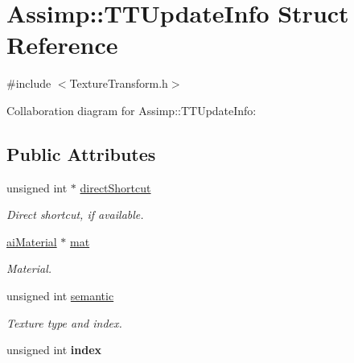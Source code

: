 \hypertarget{struct_assimp_1_1_t_t_update_info}{\section{Assimp\+:\+:T\+T\+Update\+Info Struct Reference}
\label{struct_assimp_1_1_t_t_update_info}
}


{\ttfamily \#include $<$Texture\+Transform.\+h$>$}



Collaboration diagram for Assimp\+:\+:T\+T\+Update\+Info\+:
\subsection*{Public Attributes}
\begin{DoxyCompactItemize}
\item 
\hypertarget{struct_assimp_1_1_t_t_update_info_a06a3310fd9c085152a66ee982831fb5e}{unsigned int $\ast$ \hyperlink{struct_assimp_1_1_t_t_update_info_a06a3310fd9c085152a66ee982831fb5e}{direct\+Shortcut}}\label{struct_assimp_1_1_t_t_update_info_a06a3310fd9c085152a66ee982831fb5e}

\begin{DoxyCompactList}\small\item\em Direct shortcut, if available. \end{DoxyCompactList}\item 
\hypertarget{struct_assimp_1_1_t_t_update_info_a9d2d783df4e788fe7ef90d428c2ad7b6}{\hyperlink{classai_material}{ai\+Material} $\ast$ \hyperlink{struct_assimp_1_1_t_t_update_info_a9d2d783df4e788fe7ef90d428c2ad7b6}{mat}}\label{struct_assimp_1_1_t_t_update_info_a9d2d783df4e788fe7ef90d428c2ad7b6}

\begin{DoxyCompactList}\small\item\em Material. \end{DoxyCompactList}\item 
\hypertarget{struct_assimp_1_1_t_t_update_info_aa87e70c6fd26f436dae226b1a27a06a6}{unsigned int \hyperlink{struct_assimp_1_1_t_t_update_info_aa87e70c6fd26f436dae226b1a27a06a6}{semantic}}\label{struct_assimp_1_1_t_t_update_info_aa87e70c6fd26f436dae226b1a27a06a6}

\begin{DoxyCompactList}\small\item\em Texture type and index. \end{DoxyCompactList}\item 
\hypertarget{struct_assimp_1_1_t_t_update_info_a8319bc15c37660d6d557e92ecdc774f0}{unsigned int {\bfseries index}}\label{struct_assimp_1_1_t_t_update_info_a8319bc15c37660d6d557e92ecdc774f0}

\end{DoxyCompactItemize}


